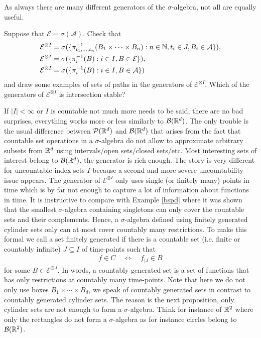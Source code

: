As always there are many different generators of the $\sigma$-algebra, not all are equally useful.
\begin{luebung}
	Suppose that $\mathcal E=\sigma(\mathcal A)$. Check that 
	\begin{align*}
		\mathcal E^{\otimes I}&= \sigma( \{\pi^{-1}_{t_1,...,t_n}(B_1\times \cdots \times B_n):n\in\mathbb{N}, t_i\in J, B_i\in \mathcal A\}),\\
		\mathcal E^{\otimes I}&= \sigma( \{\pi_i^{-1}(B):i \in I, B\in  \mathcal E \}),\\	
		\mathcal E^{\otimes I}&= \sigma( \{\pi_i^{-1}(B):i \in I, B\in  \mathcal A\})
	\end{align*}
	and draw some examples of sets of paths in the generators of $\mathcal E^{\otimes I}$.	Which of the generators of $\mathcal E^{\otimes I}$ is intersection stable?
\end{luebung}
If $|I|<\infty$ or $I$ is countable not much more needs to be said, there are no bad surprises, everything works more or less similarly to $\mathcal B(\mathbb{R}^d)$. The only trouble is the usual difference between $\mathcal P(\mathbb{R}^d)$ and $\mathcal B(\mathbb{R}^d)$ that arises from the fact that countable set operations in a $\sigma$-algebra do not allow to approximate arbitrary subsets from $\mathbb{R}^d$ using intervals/open sets/closed sets/etc. Most interesting sets of interest belong to $\mathcal B(\mathbb{R}^d)$, the generator is rich enough. The story is very different for uncountable index sets $I$ because a second and more severe uncountability issue appears. The generator of $\mathcal E^{\otimes I}$ only uses single (or finitely many) points in time which is by far not enough to capture a lot of information about functions in time. It is instructive to compare with Example \ref{bspd} where it was shown that the smallest $\sigma$-algebra containing singletons can only cover the countable sets and their complements. Hence, a $\sigma$-algebra defined using finitely generated cylinder sets only can at most cover countably many restrictions. To make this formal we call a set finitely generated if there is a countable set (i.e. finite or countably infinite) $J\subseteq I$ of time-points such that
\begin{align*}
	f\in C\quad \Leftrightarrow \quad f_{|J}\in B
\end{align*}
for some $B\in \mathcal E^{\otimes J}$. In words, a countably generated set is a set of functions that has only restrictions at countably many time-points. Note that here we do not only use boxes $B_1\times \cdots \times B_d$, we speak of countably generated sets in contrast to countably generated cylinder sets. The reason is the next proposition, only cylinder sets are not enough to form a $\sigma$-algebra. Think for instance of $\mathbb{R}^2$ where only the rectangles do not form a $\sigma$-algebra as for instance circles belong to $\mathcal B(\mathbb{R}^2)$.
